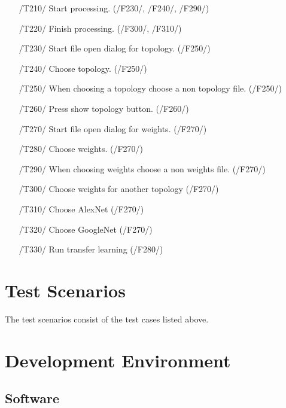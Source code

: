 \documentclass[parskip=full]{scrartcl}
\begin{document}
\begin{itemize}
	\item[/T210/] Start processing. (/F230/, /F240/, /F290/)
	\item[/T220/] Finish processing. (/F300/, /F310/)
	\item[/T230/] Start file open dialog for topology. (/F250/)
	\item[/T240/] Choose topology. (/F250/)
	\item[/T250/] When choosing a topology choose a non topology file. (/F250/)
	\item[/T260/] Press show topology button. (/F260/)
	\item[/T270/] Start file open dialog for weights. (/F270/)
	\item[/T280/] Choose weights. (/F270/)
	\item[/T290/] When choosing weights choose a non weights file. (/F270/)
	\item[/T300/] Choose weights for another topology (/F270/)
	\item[/T310/] Choose AlexNet (/F270/)
	\item[/T320/] Choose GoogleNet (/F270/)
	\item[/T330/] Run transfer learning (/F280/)
\end{itemize}

\pagebreak





\section{Test Scenarios}

The test scenarios consist of the test cases listed above.

\pagebreak





\section{Development Environment}

\subsection {Software}
\end{document}
